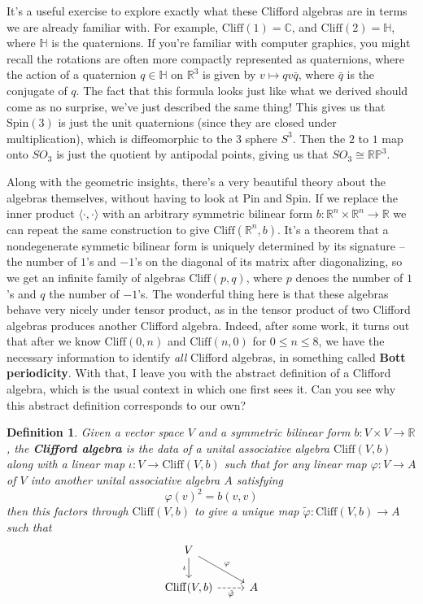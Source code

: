 \documentclass{article}
\newcommand{\C}{\mathbb{C}}
\newcommand{\R}{\mathbb{R}}
\newtheorem{definition}{Definition}[subsection]
\begin{document}
It's a useful exercise to explore exactly what these Clifford algebras are in terms we are already familiar with. For example, $\mathrm{Cliff}(1) = \C$, and $\mathrm{Cliff}(2) = \mathbb{H}$, where $\mathbb{H}$ is the quaternions. If you're familiar with computer graphics, you might recall the rotations are often more compactly represented as quaternions, where the action of a quaternion $q \in \mathbb{H}$ on $\R^3$ is given by $v \mapsto qv\bar{q}$, where $\bar{q}$ is the conjugate of $q$. The fact that this formula looks just like what we derived should come as no surprise, we've just described the same thing! This gives us that $\mathrm{Spin}(3)$ is just the unit quaternions (since they are closed under multiplication), which is diffeomorphic to the $3$ sphere $S^3$. Then the $2$ to $1$ map onto $SO_3$ is just the quotient by antipodal points, giving us that $SO_3 \cong \mathbb{RP}^3$.

Along with the geometric insights, there's a very beautiful theory about the algebras themselves, without having to look at $\mathrm{Pin}$ and $\mathrm{Spin}$. If we replace the inner product $\langle \cdot,\cdot \rangle$ with an arbitrary symmetric bilinear form $b : \R^n \times \R^n \to \R$ we can repeat the same construction to give $\mathrm{Cliff}(\R^n ,b)$. It's a theorem that a nondegenerate symmetic bilinear form is uniquely determined by its signature -- the number of $1$'s and $-1$'s on the diagonal of its matrix after diagonalizing, so we get an infinite family of algebras $\mathrm{Cliff}(p,q)$, where $p$ denoes the number of $1$'s and $q$ the number of $-1$'s. The wonderful thing here is that these algebras behave very nicely under tensor product, as in the tensor product of two Clifford algebras produces another Clifford algebra. Indeed, after some work, it turns out that after we know $\mathrm{Cliff}(0,n)$ and $\mathrm{Cliff}(n,0)$ for $0 \leq n \leq 8$, we have the necessary information to identify \emph{all} Clifford algebras, in something called \textbf{Bott periodicity}. With that, I leave you with the abstract definition of a Clifford algebra, which is the usual context in which one first sees it. Can you see why this abstract definition corresponds to our own?
\begin{definition}
Given a vector space $V$ and a symmetric bilinear form $b : V \times V \to \R$, the \textbf{Clifford algebra} is the data of a unital associative algebra $\mathrm{Cliff}(V,b)$ along with a linear map $\iota : V \to \mathrm{Cliff}(V,b)$ such that for any linear map $\varphi : V \to A$ of $V$ into another unital associative algebra $A$ satisfying 
$$\varphi(v)^2 = b(v,v) $$
then this factors through $\mathrm{Cliff}(V,b)$ to give a unique map $\tilde{\varphi} : \mathrm{Cliff}(V,b) \to A$ such that 
$$\begin{tikzcd} 
V \ar[d, "\iota"'] \ar[dr, "\varphi"] \\
\mathrm{Cliff}(V,b) \ar[r, "\tilde{\varphi}"', dashed] & A
\end{tikzcd}$$
\end{definition}
%
\end{document}
